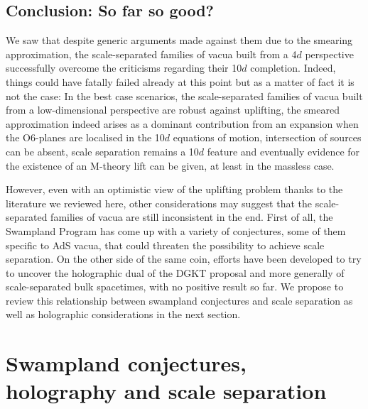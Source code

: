 \documentclass[11pt, a4paper]{article}
\begin{document}
\subsection{Conclusion: So far so good?}

We saw that despite generic arguments made against them due to the smearing approximation, the scale-separated families of vacua built from a 4$d$ perspective successfully overcome the criticisms regarding their 10$d$ completion. Indeed, things could have fatally failed already at this point but as a matter of fact it is not the case: In the best case scenarios, the scale-separated families of vacua built from a low-dimensional perspective are robust against uplifting, the smeared approximation indeed arises as a dominant contribution from an expansion when the O6-planes are localised in the 10$d$ equations of motion, intersection of sources can be absent, scale separation remains a 10$d$ feature and eventually evidence for the existence of an M-theory lift can be given, at least in the massless case.

However, even with an optimistic view of the uplifting problem thanks to the literature we reviewed here, other considerations may suggest that the scale-separated families of vacua are still inconsistent in the end. First of all, the Swampland Program \cite{Vafa:2005ui,Brennan:2017rbf,Palti:2019pca,vanBeest:2021lhn,Grana:2021zvf} has come up with a variety of conjectures, some of them specific to AdS vacua, that could threaten the possibility to achieve scale separation. On the other side of the same coin, efforts have been developed to try to uncover the holographic dual of the DGKT proposal and more generally of scale-separated bulk spacetimes, with no positive result so far. We propose to review this relationship between swampland conjectures and scale separation as well as holographic considerations in the next section.

\section{Swampland conjectures, holography and scale separation}
\label{sec:conjs}
\end{document}
